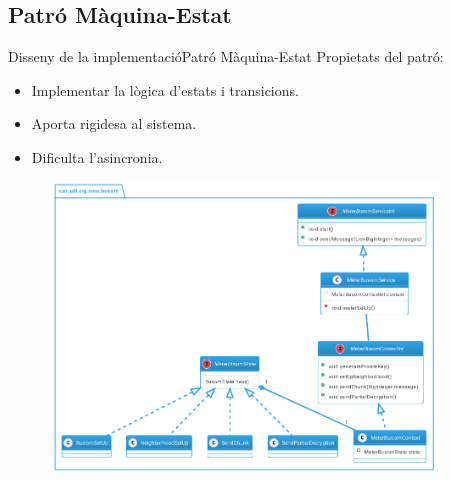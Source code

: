 \documentclass{beamer}
\begin{document}
\subsection{Patró Màquina-Estat}
\begin{frame}{Disseny de la implementació}{Patró Màquina-Estat}
	Propietats del patró:
	\begin{itemize}
		\item Implementar la lògica d'estats i transicions.
		\item Aporta rigidesa al sistema.
		\item Dificulta l'asincronia.
	\end{itemize}
\end{frame}
\begin{frame}
	\begin{figure}
		\includegraphics[width=28em]{images/busomprot}
	\end{figure}
\end{frame}
\end{document}
